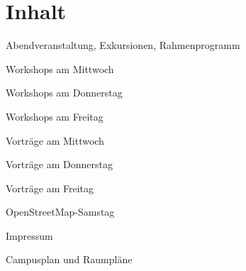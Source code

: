 \section*{Inhalt}
\label{contents}
\newlength\contentspace
\setlength\contentspace{0.2em}

\vspace*{\contentspace}%
\noindent Abendveranstaltung, Exkursionen, Rahmenprogramm  \dotfill \pageref{schwaetzli}

\vspace*{\contentspace}%
\noindent Workshops am Mittwoch \dotfill \pageref{mittwoch-workshops}

\vspace*{\contentspace}%
\noindent Workshops am Donnerstag \dotfill \pageref{donnerstag-workshops}

\vspace*{\contentspace}%
\noindent Workshops am Freitag \dotfill \pageref{freitag-workshops}

\vspace*{\contentspace}%
\noindent Vorträge am Mittwoch \dotfill \pageref{mittwoch}

\vspace*{\contentspace}%
\noindent Vorträge am Donnerstag \dotfill \pageref{donnerstag}

\vspace*{\contentspace}%
\noindent Vorträge am Freitag \dotfill \pageref{freitag}

\vspace*{\contentspace}%
\noindent OpenStreetMap-Samstag \dotfill \pageref{samstag}

\vspace*{\contentspace}%
\noindent Impressum \dotfill \pageref{impressum}

\vspace*{\contentspace}%
\noindent Campusplan und Raumpläne \dotfill \pageref{kartenseiten}

\justifying

\newpage
